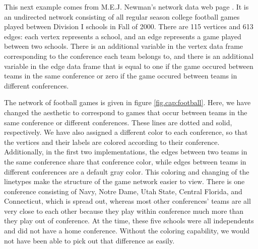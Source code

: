 This next example comes from M.E.J. Newman's network data web page \citep{football}.  It is an undirected network consisting of all regular season college football games played between Division I schools in Fall of 2000.  There are 115 vertices and 613 edges: each vertex represents a school, and an edge represents a game played between two schools. There is an additional variable in the vertex data frame corresponding to the conference each team belongs to, and there is an additional variable in the edge data frame that is equal to one if the game occured between teams in the same conference or zero if the game occured between teams in different conferences.

The network of football games is given in figure \ref{fig.cap:football}. Here, we have changed the  aesthetic to correspond to games that occur between teams in the same conference or different conferences.  These lines are dotted and solid, respectively. We have also assigned a different color to each conference, so that the vertices and their labels are colored according to their conference. Additionally, in the first two implementations, the edges between two teams in the same conference share that conference color, while edges between teams in different conferences are a default gray color. This coloring and changing of the linetypes make the structure of the game network easier to view.  There is one conference consisting of Navy, Notre Dame, Utah State, Central Florida, and Connecticut, which is spread out, whereas most other conferences' teams are all very close to each other because they play within conference much more than they play out of conference.  At the time, these five schools were all independents and did not have a home conference.  Without the coloring capability, we would not have been able to pick out that difference as easily.

